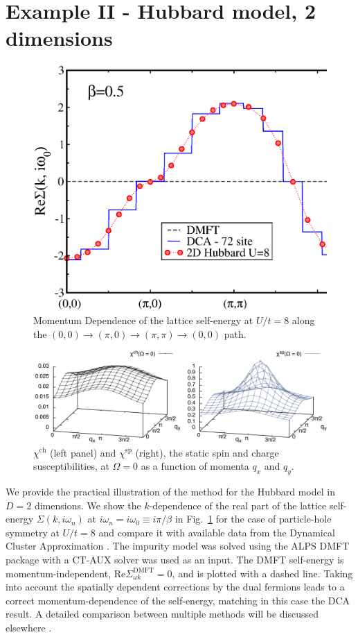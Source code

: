 \documentclass[3p,times,procedia]{elsarticle}
\begin{document}
\section{Example II - Hubbard model, 2 dimensions}\label{sec:ex}

\begin{figure}[ht]
\centering
\includegraphics[width=0.6\columnwidth]{DF_U12.eps}
\caption{Momentum Dependence of the lattice self-energy at $U/t = 8$ along the $(0,0)\to(\pi,0)\to(\pi,\pi)\to(0,0)$ path.}
\label{fig:sigma}
\end{figure}

\begin{figure}[ht]
\centering
\includegraphics[width=\columnwidth]{susc.pdf}
\caption{$\chi^{\mathrm{ch}}$ (left panel) and $\chi^{\mathrm{sp}}$ (right), the static spin and charge susceptibilities, at $\Omega = 0$ as a function of momenta $q_x$ and $q_y$. }
\label{fig:susc}
\end{figure}

We provide the practical illustration of the method for the Hubbard model in $D=2$ dimensions. We show the $k$-dependence of the real part of the lattice self-energy $\Sigma(k, i\omega_n)$ at $i\omega_n=i\omega_0 \equiv i\pi/\beta$ in Fig.~\ref{fig:sigma} for the case of particle-hole symmetry at $U/t=8$ and compare it with available data from the Dynamical Cluster Approximation \cite{MaierJarrell:2005}. The impurity model was solved using the ALPS DMFT \cite{ALPSDMFT} package with a CT-AUX solver \cite{Gull2008b} was used as an input. The DMFT self-energy is momentum-independent, $\mathrm{Re} \Sigma_{\omega k}^{\mathrm{DMFT}} = 0$, and is plotted with a dashed line. Taking into account the spatially dependent corrections by the dual fermions leads to a correct momentum-dependence of the self-energy, matching in this case the DCA result. A detailed comparison between multiple methods will be discussed elsewhere \cite{LeBlanc2015}. 
\end{document}
